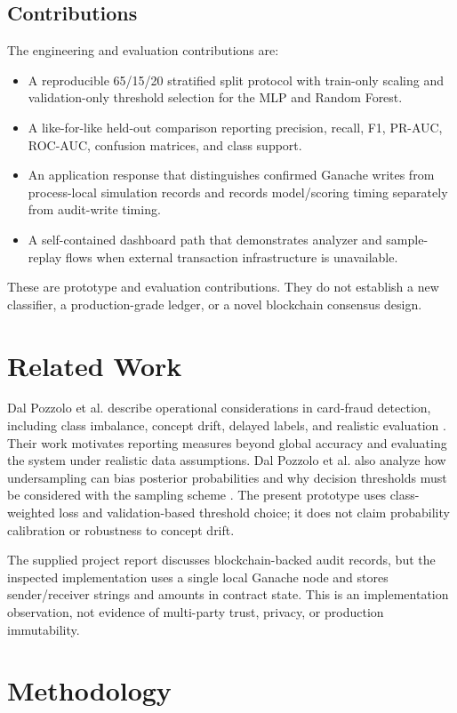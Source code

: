 \documentclass[conference]{IEEEtran}
\begin{document}
\subsection{Contributions}
The engineering and evaluation contributions are:
\begin{itemize}
  \item A reproducible 65/15/20 stratified split protocol with train-only scaling and validation-only threshold selection for the MLP and Random Forest.
  \item A like-for-like held-out comparison reporting precision, recall, F1, PR-AUC, ROC-AUC, confusion matrices, and class support.
  \item An application response that distinguishes confirmed Ganache writes from process-local simulation records and records model/scoring timing separately from audit-write timing.
  \item A self-contained dashboard path that demonstrates analyzer and sample-replay flows when external transaction infrastructure is unavailable.
\end{itemize}

These are prototype and evaluation contributions. They do not establish a new classifier, a production-grade ledger, or a novel blockchain consensus design.

\section{Related Work}
Dal Pozzolo et al. describe operational considerations in card-fraud detection, including class imbalance, concept drift, delayed labels, and realistic evaluation \cite{dalpozzolo2018}. Their work motivates reporting measures beyond global accuracy and evaluating the system under realistic data assumptions. Dal Pozzolo et al. also analyze how undersampling can bias posterior probabilities and why decision thresholds must be considered with the sampling scheme \cite{dalpozzolo2015}. The present prototype uses class-weighted loss and validation-based threshold choice; it does not claim probability calibration or robustness to concept drift.

The supplied project report discusses blockchain-backed audit records, but the inspected implementation uses a single local Ganache node and stores sender/receiver strings and amounts in contract state. This is an implementation observation, not evidence of multi-party trust, privacy, or production immutability.

\section{Methodology}
\end{document}
